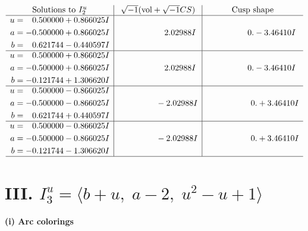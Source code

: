 \documentclass[1p]{elsarticle_modified}
\theoremstyle{definition}
\newcommand{\I}{\sqrt{-1}}
\begin{document}
$$\begin{array}{c|c|c}  
\text{Solutions to }I^u_{2}& \I (\text{vol} + \sqrt{-1}CS) & \text{Cusp shape}\\
 \hline 
\begin{aligned}
u &= \phantom{-}0.500000 + 0.866025 I \\
a &= -0.500000 + 0.866025 I \\
b &= \phantom{-}0.621744 - 0.440597 I\end{aligned}
 & \phantom{-0.000000 -}2.02988 I & \phantom{-0.000000 } 0. - 3.46410 I \\ \hline\begin{aligned}
u &= \phantom{-}0.500000 + 0.866025 I \\
a &= -0.500000 + 0.866025 I \\
b &= -0.121744 + 1.306620 I\end{aligned}
 & \phantom{-0.000000 -}2.02988 I & \phantom{-0.000000 } 0. - 3.46410 I \\ \hline\begin{aligned}
u &= \phantom{-}0.500000 - 0.866025 I \\
a &= -0.500000 - 0.866025 I \\
b &= \phantom{-}0.621744 + 0.440597 I\end{aligned}
 & \phantom{-0.000000 } -2.02988 I & \phantom{-0.000000 -}0. + 3.46410 I \\ \hline\begin{aligned}
u &= \phantom{-}0.500000 - 0.866025 I \\
a &= -0.500000 - 0.866025 I \\
b &= -0.121744 - 1.306620 I\end{aligned}
 & \phantom{-0.000000 } -2.02988 I & \phantom{-0.000000 -}0. + 3.46410 I\\
 \hline 
 \end{array}$$\newpage\newpage\renewcommand{\arraystretch}{1}
\centering \section*{III. $I^u_{3}= \langle b+u,\;a-2,\;u^2- u+1 \rangle$}
\flushleft \textbf{(i) Arc colorings}\\
\end{document}
